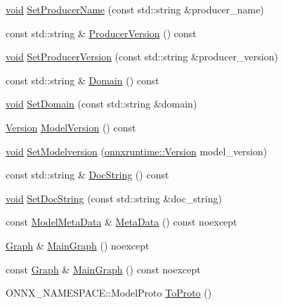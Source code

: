 \begin{DoxyCompactItemize}
\item 
\mbox{\hyperlink{mlasi_8h_a88f941d423cb2a819b70a1358982b1a6}{void}} \mbox{\hyperlink{classonnxruntime_1_1Model_a1a2ef48c73944b335843d29214809f2a}{Set\+Producer\+Name}} (const std\+::string \&producer\+\_\+name)
\item 
const std\+::string \& \mbox{\hyperlink{classonnxruntime_1_1Model_a798ddae9a5f6322fa34e2e8b5f2bd9fe}{Producer\+Version}} () const
\item 
\mbox{\hyperlink{mlasi_8h_a88f941d423cb2a819b70a1358982b1a6}{void}} \mbox{\hyperlink{classonnxruntime_1_1Model_a5c4641b87c9285462d89a04e28e0824d}{Set\+Producer\+Version}} (const std\+::string \&producer\+\_\+version)
\item 
const std\+::string \& \mbox{\hyperlink{classonnxruntime_1_1Model_a17ae7242244056337ed571f19b54f51a}{Domain}} () const
\item 
\mbox{\hyperlink{mlasi_8h_a88f941d423cb2a819b70a1358982b1a6}{void}} \mbox{\hyperlink{classonnxruntime_1_1Model_a95c8874dfc54e6c808c2be66e19cefd2}{Set\+Domain}} (const std\+::string \&domain)
\item 
\mbox{\hyperlink{namespaceonnxruntime_ab7fae8d5830807c074def3bb8ae23cf1}{Version}} \mbox{\hyperlink{classonnxruntime_1_1Model_abbcaaa6b05f740e6a309b1bd250f2e2a}{Model\+Version}} () const
\item 
\mbox{\hyperlink{mlasi_8h_a88f941d423cb2a819b70a1358982b1a6}{void}} \mbox{\hyperlink{classonnxruntime_1_1Model_af94a49d45c75745305a1d09e70d67f79}{Set\+Modelversion}} (\mbox{\hyperlink{namespaceonnxruntime_ab7fae8d5830807c074def3bb8ae23cf1}{onnxruntime\+::\+Version}} model\+\_\+version)
\item 
const std\+::string \& \mbox{\hyperlink{classonnxruntime_1_1Model_a3255fd55fde8752cc61e1d7da47b3ee2}{Doc\+String}} () const
\item 
\mbox{\hyperlink{mlasi_8h_a88f941d423cb2a819b70a1358982b1a6}{void}} \mbox{\hyperlink{classonnxruntime_1_1Model_a5a2597f28c82e677099831245dfac50b}{Set\+Doc\+String}} (const std\+::string \&doc\+\_\+string)
\item 
const \mbox{\hyperlink{namespaceonnxruntime_a13519c21da77ccc594726b670276a266}{Model\+Meta\+Data}} \& \mbox{\hyperlink{classonnxruntime_1_1Model_a43f838a44bfe7970a114400006b54fe2}{Meta\+Data}} () const noexcept
\item 
\mbox{\hyperlink{classonnxruntime_1_1Graph}{Graph}} \& \mbox{\hyperlink{classonnxruntime_1_1Model_a3107455565d368aa674ab19cd156a433}{Main\+Graph}} () noexcept
\item 
const \mbox{\hyperlink{classonnxruntime_1_1Graph}{Graph}} \& \mbox{\hyperlink{classonnxruntime_1_1Model_a2a97e4baaf0238d56a4c1f583c3430ab}{Main\+Graph}} () const noexcept
\item 
O\+N\+N\+X\+\_\+\+N\+A\+M\+E\+S\+P\+A\+C\+E\+::\+Model\+Proto \mbox{\hyperlink{classonnxruntime_1_1Model_a6548029afd30cb62977066de5f70cb90}{To\+Proto}} ()
\end{DoxyCompactItemize}
